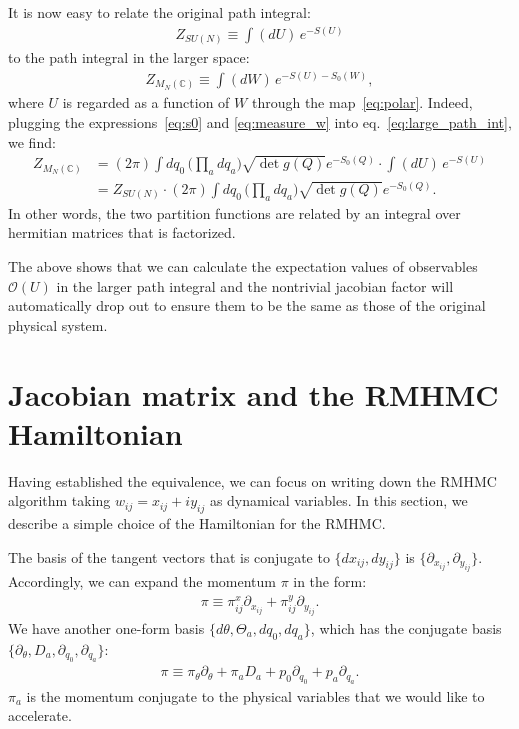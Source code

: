 \documentclass[12pt]{article}
\begin{document}
It is now easy to relate the original path integral:
\begin{align}
  Z_{SU(N)}
  \equiv
  \int(dU)\,
  e^{-S(U)}
\end{align}
to the path integral in the larger space:
\begin{align}
  Z_{M_N(\mathbb{C})}
  \equiv
  \int (dW)\,
  e^{ - S(U)- S_0(W)},
  \label{eq:large_path_int}
\end{align}
where $U$ is regarded as a function of $W$ through the map~\eqref{eq:polar}.
Indeed, plugging the expressions~\eqref{eq:s0} and \eqref{eq:measure_w}
into eq.~\eqref{eq:large_path_int}, we find:
\begin{align}
  Z_{M_N(\mathbb{C})}
  &=
    (2\pi)
    \int
    dq_0
    \,
    \Big(\prod_a dq_a\Big)
    \sqrt{\det g(Q)}
    e^{-S_0(Q)}
    \cdot
    \int
    (dU)\, e^{-S(U)} \nonumber \\
  &=
    Z_{SU(N)}
    \cdot
    (2\pi)
    \int
    dq_0
    \,
    \Big(\prod_a dq_a\Big)
    \sqrt{\det g(Q)}
    e^{-S_0(Q)}.
\end{align}
In other words,
the two partition functions are related by
an integral over hermitian matrices
that is factorized.

The above shows that we can calculate the expectation values of
observables ${\mathcal O}(U)$ in the larger path integral
and the nontrivial jacobian factor will automatically drop out
to ensure them to be the same as those of the original physical system.



\section{Jacobian matrix and the RMHMC Hamiltonian}
\label{sec:rmhmc_hamil}

Having established the equivalence,
we can focus on writing down the
RMHMC algorithm taking
$w_{ij}=x_{ij}+iy_{ij}$ as dynamical variables.
In this section, we describe a simple
choice of the Hamiltonian for the RMHMC.

The basis of the tangent vectors
that is conjugate to $\{dx_{ij}, dy_{ij}\}$
is $\{\partial_{x_{ij}}, \partial_{y_{ij}} \}$.
Accordingly, we can expand the momentum $\pi$ in the form:
\begin{align}
  \pi
  \equiv
  \pi^x_{ij}\partial_{x_{ij}}
  +
  \pi^y_{ij}\partial_{y_{ij}}.
\end{align}
We have another one-form basis
$\{d\theta, \Theta_a, dq_0, dq_a\}$,
which has the conjugate basis
$\{\partial_\theta, D_a, \partial_{q_0}, \partial_{q_a} \}$:
\begin{align}
  \pi
  \equiv
  \pi_\theta \partial_{\theta}
  +
  \pi_a D_a
  +
  p_0 \partial_{q_0}
  +
  p_a \partial_{q_a}.
\end{align}
$\pi_a$ is the momentum conjugate to the physical variables
that we would like to accelerate.
\end{document}
